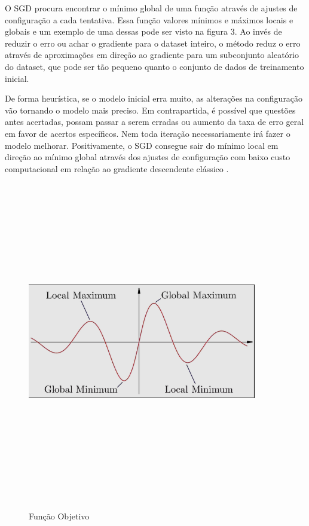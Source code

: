 O SGD procura encontrar o mínimo global de uma função através de ajustes de configuração a cada tentativa. Essa função valores mínimos e máximos locais e globais e um exemplo de uma dessas pode ser visto na figura 3. Ao invés de reduzir o erro ou achar o gradiente para o dataset inteiro, o método reduz o erro através de aproximações em direção ao gradiente para um subconjunto aleatório do dataset, que pode ser tão pequeno quanto o conjunto de dados de treinamento inicial.

De forma heurística, se o modelo inicial erra muito, as alterações na configuração vão tornando o modelo mais preciso. Em contrapartida, é possível que questões antes acertadas, possam passar a serem erradas ou aumento da taxa de erro geral em favor de acertos específicos. Nem toda iteração necessariamente irá fazer o modelo melhorar.
Positivamente, o SGD consegue sair do mínimo local em direção ao mínimo global através dos ajustes de configuração com baixo custo computacional em relação ao gradiente descendente clássico \cite{overview_gradient_descent_stochastic}.

\begin{figure}[ht]
    \centering
    \caption{Função Objetivo}
    \includegraphics[width=10cm,height=14cm,keepaspectratio]{figuras/funcao_objetivo.png} 
    \label{fig:internet} 
\end{figure}

